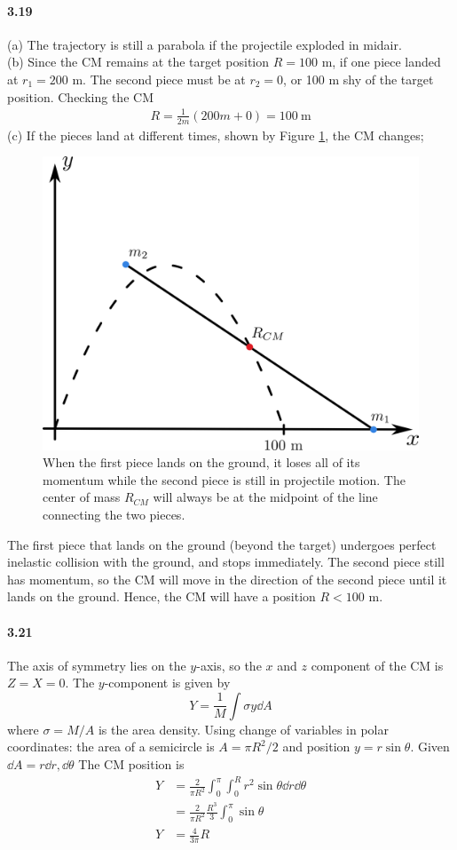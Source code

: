 \documentclass[../problems.tex]{subfiles}
\begin{document}
\paragraph{3.19}
(a) The trajectory is still a parabola if the projectile exploded in midair.\\
(b) Since the CM remains at the target position $R = 100$ m, if one piece landed at $r_1 = 200$ m.
The second piece must be at $r_2 = 0$, or 100 m shy of the target position. Checking the CM
\begin{align*}
    R = \frac{1}{2m} (200 m + 0) = \qty{100}{\m}
\end{align*}
(c) If the pieces land at different times, shown by Figure \ref{fig:3_19}, the CM changes;
\begin{figure}[ht]
    \centering
    \includegraphics[width=0.4\linewidth]{../images/fig3_19.png}
    \captionsetup{width=0.7\linewidth}
    \caption{When the first piece lands on the ground, it loses all of its momentum while the second
    piece is still in projectile motion. The center of mass $R_{CM}$ will always be at the midpoint
    of the line connecting the two pieces.}
    \label{fig:3_19}
\end{figure}
The first piece that lands on the ground (beyond the target) undergoes perfect inelastic collision 
with the ground, and stops immediately. The second piece still has momentum, so the
CM will move in the direction of the second piece until it lands on the ground. Hence, the CM will
have a position $R < 100$ m.

\paragraph{3.21}
The axis of symmetry lies on the $y$-axis, so the $x$ and $z$ component of the CM is $Z = X = 0$. 
The $y$-component is given by
\begin{equation*}
    Y = \frac{1}{M} \int \sigma y \dd{A}
\end{equation*}
where $\sigma = M/A$ is the area density. Using change of variables in polar coordinates: the area
of a semicircle is $A = \pi R^2/2$ and position $y = r \sin{\theta}$. Given $\dd{A} = r \dd{r},
\dd{\theta}$ The CM position is
\begin{align*}
    Y &= \frac{2}{\pi R^2} \int_0^{\pi} \int_0^R r^2 \sin\theta \dd{r} \dd{\theta} \\
    &= \frac{2}{\pi R^2} \frac{R^3}{3} \int_0^{\pi} \sin\theta  \\
    Y & = \frac{4}{3\pi}R
\end{align*}
\end{document}
